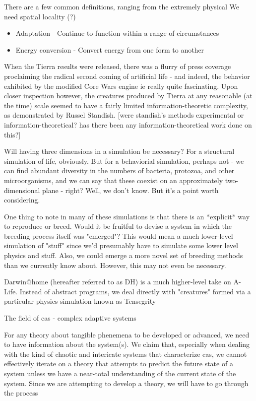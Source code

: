 \documentclass{article}
\begin{document}
There are a few common definitions, ranging from the extremely physical
We need spatial locality (?)

\begin{itemize}
\item Adaptation - Continue to function within a range of circumstances
\item Energy conversion - Convert energy from one form to another
\end{itemize}
	
When the Tierra results were released, there was a flurry of press coverage proclaiming the radical second coming of artificial life - and indeed, the behavior exhibited by the modified Core Wars engine ie really quite fascinating. Upon closer inspection however, the creatures produced by Tierra at any reasonable (at the time) scale seemed to have a fairly limited information-theoretic complexity, as demonstrated by  Russel Standish. [were standish's methods experimental or information-theoretical? has there been any information-theoretical work done on this?]


Will having three dimensions in a simulation be necessary? For a structural simulation of life, obviously. But for a behaviorial simulation, perhaps not - we can find abundant diversity in the numbers of bacteria, protozoa, and other microorganisms, and we can say that these coexist on an approximately two-dimensional plane - right? Well, we don't know. But it's a point worth considering.

One thing to note in many of these simulations is that there is an *explicit* way to reproduce or breed. Would it be fruitful to devise a system in which the breeding process itself was "emerged"? This would mean a much lower-level simulation of "stuff" since we'd presumably have to simulate some lower level physics and stuff. Also, we could emerge a more novel set of breeding methods than we currently know about. However, this may not even be necessary.

Darwin@home (hereafter referred to as DH) is a much higher-level take on A-Life. Instead of abstract programs, we deal directly with "creatures" formed via a particular physics simulation known as Tensegrity






 The field of cas - complex adaptive systems


For any theory about tangible phenemena to be developed or advanced, we need to have information about the system(s). We claim that, especially when dealing with the kind of chaotic and intericate systems that characterize cas, we cannot effectively iterate on a theory that attempts to predict the future state of a system unless we have a near-total understanding of the current state of the system. Since we are attempting to develop a theory, we will have to go through the process
\end{document}
